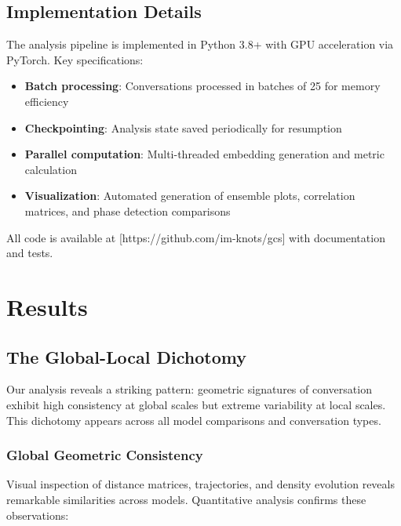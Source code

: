 \documentclass[11pt,letterpaper]{article}
\begin{document}
\subsection{Implementation Details}

The analysis pipeline is implemented in Python 3.8+ with GPU acceleration via PyTorch. Key specifications:
\begin{itemize}
\item \textbf{Batch processing}: Conversations processed in batches of 25 for memory efficiency
\item \textbf{Checkpointing}: Analysis state saved periodically for resumption
\item \textbf{Parallel computation}: Multi-threaded embedding generation and metric calculation
\item \textbf{Visualization}: Automated generation of ensemble plots, correlation matrices, and phase detection comparisons
\end{itemize}

All code is available at [https://github.com/im-knots/gcs] with documentation and tests.

\section{Results}

\subsection{The Global-Local Dichotomy}

Our analysis reveals a striking pattern: geometric signatures of conversation exhibit high consistency at global scales but extreme variability at local scales. This dichotomy appears across all model comparisons and conversation types.

\subsubsection{Global Geometric Consistency}

Visual inspection of distance matrices, trajectories, and density evolution reveals remarkable similarities across models. Quantitative analysis confirms these observations:
\end{document}
